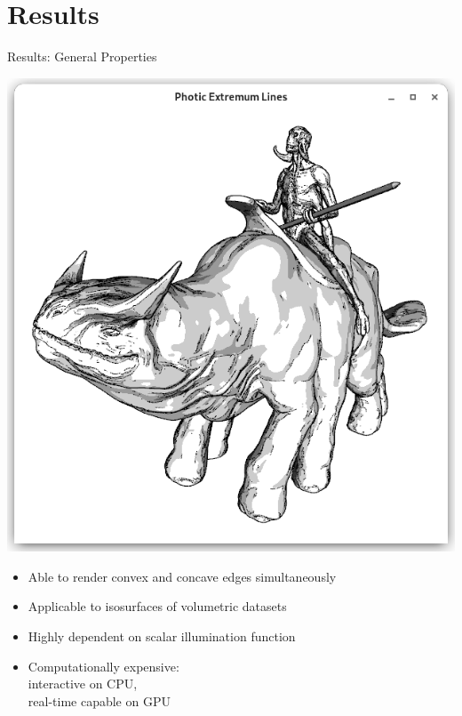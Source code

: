 \documentclass[aspectratio=169]{beamer}
\begin{document}
\section{Results}
  \begin{frame}{Results: General Properties}
    \begin{minipage}[c]{0.49\textwidth}
      \center
      \includegraphics[width=\textwidth,trim={15px 15 15 50},clip]{images/rider.png}
    \end{minipage}
    \pause
    \begin{minipage}[c]{0.49\textwidth}
      \begin{itemize}
        \item<+-> Able to render convex and concave edges simultaneously
        \item<+-> Applicable to isosurfaces of volumetric datasets
        \item<+-> Highly dependent on scalar illumination function
        \item<+-> Computationally expensive: \\
        interactive on CPU, \\
        real-time capable on GPU
      \end{itemize}
    \end{minipage}
  \end{frame}
\end{document}
